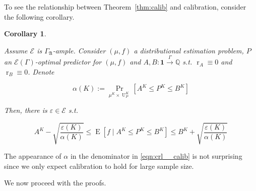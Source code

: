 \documentclass{article}
\numberwithin{equation}{section}
\theoremstyle{definition}
\theoremstyle{plain}
\newtheorem{corollary}{Corollary}[section]
\DeclareMathOperator{\Prb}{Pr}
\DeclareMathOperator{\E}{E}
\DeclareMathOperator{\R}{r}
\DeclareMathOperator{\Un}{U}
\newcommand{\Rats}{\mathbb{Q}}
\newcommand{\GrowA}{\Gamma_{\mathfrak{A}}}
\newcommand{\Fall}{\mathcal{E}}
\newcommand{\EG}{\Fall(\Gamma)}
\newcommand{\Scheme}{\xrightarrow{\Gamma}}
\begin{document}
To see the relationship between Theorem~\ref{thm:calib} and calibration, consider the following corollary.

\begin{corollary}
\label{crl:calib}

Assume $\Fall$ is $\GrowA$-ample. Consider $(\mu,f)$ a distributional estimation problem, $P$ an $\EG$-optimal predictor for $(\mu,f)$ and $A,B: \bm{1} \Scheme \Rats$ s.t. $\R_A \equiv 0$ and $\R_B \equiv 0$. Denote

\[\alpha(K):=\Prb_{\mu^{K} \times \Un_P^{K}}[A^{K} \leq P^{K} \leq B^{K}]\] 

Then, there is $\varepsilon \in \Fall$ s.t. 

\begin{equation}
\label{eqn:crl__calib}
A^{K} - \sqrt{\frac{\varepsilon(K)}{\alpha(K)}} \leq \E[f \mid A^{K} \leq P^{K} \leq B^{K}] \leq B^{K} + \sqrt{\frac{\varepsilon(K)}{\alpha(K)}}
\end{equation}

\end{corollary}

The appearance of $\alpha$ in the denominator in \ref{eqn:crl__calib} is not surprising since we only expect calibration to hold for large sample size.

We now proceed with the proofs.
\end{document}
